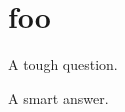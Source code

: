 \documentclass{book}
\begin{document}
\chapter{foo}
\begin{Exercise}[title={foo}, label=ex1]
A tough question.
\end{Exercise}

\begin{Answer}[ref={ex1}]
A smart answer.

\begin{figure}[htp]
   \centering
   \label{fig:ex1}
\end{figure}
\end{Answer}
\end{document}
